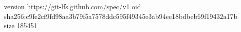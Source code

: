 version https://git-lfs.github.com/spec/v1
oid sha256:c9fe2cf9fd98aa3b79f5a7578ddc595f49345e3ab94ee18bdbeb69f19432a17b
size 185451
